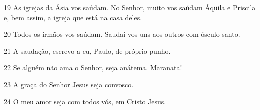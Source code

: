 \par 19 As igrejas da Ásia vos saúdam. No Senhor, muito vos saúdam Áqüila e Priscila e, bem assim, a igreja que está na casa deles.
\par 20 Todos os irmãos vos saúdam. Saudai-vos uns aos outros com ósculo santo.
\par 21 A saudação, escrevo-a eu, Paulo, de próprio punho.
\par 22 Se alguém não ama o Senhor, seja anátema. Maranata!
\par 23 A graça do Senhor Jesus seja convosco.
\par 24 O meu amor seja com todos vós, em Cristo Jesus.


